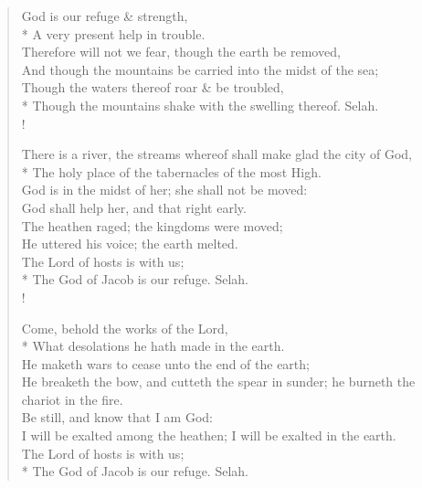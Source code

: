 \documentclass[MAIN]{subfiles}
\begin{document}
\begin{verse}
God is our refuge \& strength,\\*
\vin A very present help in trouble.\\
Therefore will not we fear, though the earth be removed,\\
\vin And though the mountains be carried into the midst of the sea;\\
Though the waters thereof roar \& be troubled,\\*
\vin Though the mountains shake with the swelling thereof. {\hge Selah}.\\!

There is a river, the streams whereof shall make glad the city of God,\\*
\vin The holy place of the tabernacles of the most High.\\
God is in the midst of her; she shall not be moved:\\
\vin God shall help her, and that right early.\\
The heathen raged; the kingdoms were moved;\\
\vin He uttered his voice; the earth melted.\\
The Lord of hosts is with us;\\*
\vin The God of Jacob is our refuge. {\hge Selah}.\\!

Come, behold the works of the Lord,\\*
\vin What desolations he hath made in the earth.\\
He maketh wars to cease unto the end of the earth;\\
\vin He breaketh the bow, and cutteth the spear in sunder; he burneth the chariot in the fire.\\
Be still, and know that I am God:\\
\vin I will be exalted among the heathen; I will be exalted in the earth.\\
The Lord of hosts is with us;\\*
\vin The God of Jacob is our refuge. {\hge Selah}.
\end{verse}
\end{document}
